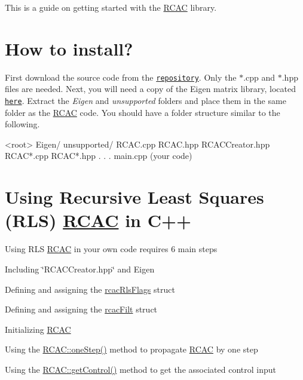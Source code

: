 This is a guide on getting started with the \hyperlink{class_r_c_a_c}{R\+C\+AC} library.

\section*{How to install? }

First download the source code from the \href{https://github.com/mohseninima/RCAC_cpp}{\tt repository}. Only the $\ast$.cpp and $\ast$.hpp files are needed. Next, you will need a copy of the Eigen matrix library, located \href{http://eigen.tuxfamily.org/}{\tt here}. Extract the {\itshape Eigen} and {\itshape unsupported} folders and place them in the same folder as the \hyperlink{class_r_c_a_c}{R\+C\+AC} code. You should have a folder structure similar to the following.


\begin{DoxyCode}
<root>
    Eigen/
    unsupported/
    RCAC.cpp
    RCAC.hpp
    RCACCreator.hpp
    RCAC*.cpp
    RCAC*.hpp
    .
    .
    .
    main.cpp (your code)
\end{DoxyCode}


\section*{Using Recursive Least Squares (R\+LS) \hyperlink{class_r_c_a_c}{R\+C\+AC} in C++ }

Using R\+LS \hyperlink{class_r_c_a_c}{R\+C\+AC} in your own code requires 6 main steps


\begin{DoxyEnumerate}
\item Including \char`\"{}\+R\+C\+A\+C\+Creator.\+hpp\char`\"{} and Eigen
\item Defining and assigning the \hyperlink{structrcac_rls_flags}{rcac\+Rls\+Flags} struct
\item Defining and assigning the \hyperlink{structrcac_filt}{rcac\+Filt} struct
\item Initializing \hyperlink{class_r_c_a_c}{R\+C\+AC}
\item Using the \hyperlink{class_r_c_a_c_a956bb6a557f050d3808d5392fd3add20}{R\+C\+A\+C\+::one\+Step()} method to propagate \hyperlink{class_r_c_a_c}{R\+C\+AC} by one step
\item Using the \hyperlink{class_r_c_a_c_ad93e5753d1810d7c3b2f6fbf56857a51}{R\+C\+A\+C\+::get\+Control()} method to get the associated control input
\end{DoxyEnumerate}


